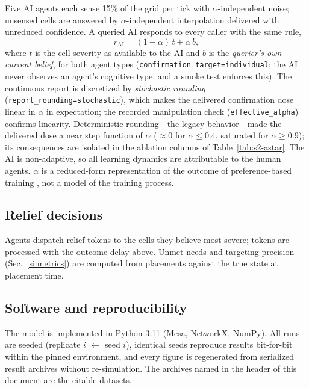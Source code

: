\documentclass[11pt]{article}
\begin{document}
Five AI agents each sense 15\% of the grid per tick with
$\alpha$-independent noise; unsensed cells are answered by
$\alpha$-independent interpolation delivered with unreduced confidence.
A queried AI responds to every caller with the same rule,
\begin{equation}
  r_{\mathrm{AI}} = (1-\alpha)\,t + \alpha\,b,
  \label{eq:alignment}
\end{equation}
where $t$ is the cell severity as available to the AI and $b$ is the
\emph{querier's own current belief}, for both agent types
(\texttt{confirmation\_target=individual}; the AI never observes an
agent's cognitive type, and a smoke test enforces this). The continuous
report is discretized by \emph{stochastic rounding}
(\texttt{report\_rounding=stochastic}), which makes the delivered
confirmation dose linear in $\alpha$ in expectation; the recorded
manipulation check (\texttt{effective\_alpha}) confirms linearity.
Deterministic rounding---the legacy behavior---made the delivered dose a
near step function of $\alpha$ ($\approx 0$ for $\alpha \leq 0.4$,
saturated for $\alpha \geq 0.9$); its consequences are isolated in the
ablation columns of Table~\ref{tab:s2-astar}. The AI is non-adaptive, so
all learning dynamics are attributable to the human agents. $\alpha$ is
a reduced-form representation of the outcome of preference-based
training \citep{christiano2017deep,ouyang2022training,sharma2023sycophancy},
not a model of the training process.

\subsection{Relief decisions}

Agents dispatch relief tokens to the cells they believe most severe;
tokens are processed with the outcome delay above. Unmet needs and
targeting precision (Sec.~\ref{si:metrics}) are computed from placements
against the true state at placement time.

\subsection{Software and reproducibility}

The model is implemented in Python 3.11 (Mesa, NetworkX, NumPy). All runs
are seeded (replicate $i$ $\leftarrow$ seed $i$), identical seeds
reproduce results bit-for-bit within the pinned environment, and every
figure is regenerated from serialized result archives without
re-simulation. The archives named in the header of this document are the
citable datasets.
\end{document}
